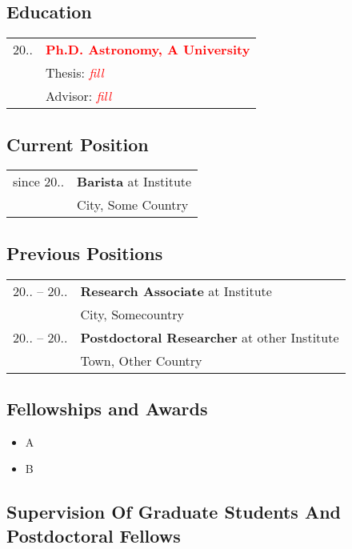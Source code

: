 \documentclass[STG]{ercgrant}
\begin{document}
\subsection{Education}
\color{red}
\begin{tabular}{p{2cm}p{12cm}}
	20..
	 & \textbf{\textcolor{red}{Ph.D. Astronomy, A University}} \\
	 & Thesis: \textit{\textcolor{red}{fill}}                  \\
	 & Advisor: \textit{\textcolor{red}{fill}}
\end{tabular}
\color{black}

\subsection{Current Position}
\color{red}
\begin{tabular}{p{2cm}p{12cm}}
	since 20..
	 & \textbf{Barista} at Institute \\
	 & City, Some Country
\end{tabular}
\color{black}

\subsection{Previous Positions}
\color{red}
\begin{tabular}{p{2cm}p{12cm}}
	20.. -- 20..
	             & \textbf{Research Associate} at Institute            \\
	             & City, Somecountry                                   \\
	20.. -- 20.. & \textbf{Postdoctoral Researcher} at other Institute \\
	             & Town, Other Country                                 \\
\end{tabular}
\color{black}

\subsection{Fellowships and Awards}
\color{red}
\begin{itemize}
	\item A
	\item B
\end{itemize}
\color{black}

\subsection{Supervision Of Graduate Students And Postdoctoral Fellows}
\end{document}
